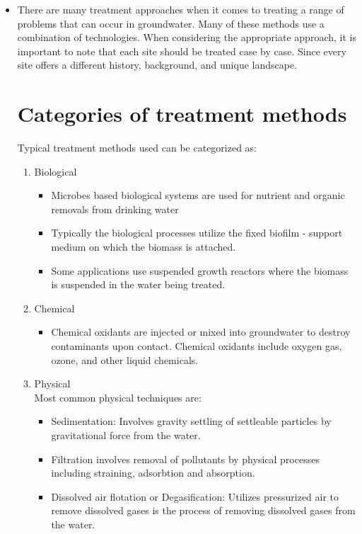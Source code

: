 \begin{itemize}
\item There are many treatment approaches when it comes to treating a range of problems that can occur in groundwater. Many of these methods use a combination of technologies. When considering the appropriate approach, it is important to note that each site should be treated case by case. Since every site offers a different history, background, and unique landscape. 

\section{Categories of treatment methods}
Typical treatment methods used can be categorized as:

\begin{enumerate}
\item Biological\\
\begin{itemize}
\item Microbes based biological systems are used for nutrient and organic removals from drinking water
\item Typically the biological processes utilize the fixed biofilm - support medium on which the biomass is attached.
\item Some applications use suspended growth reactors where the biomass is suspended in the water being treated. 
\end{itemize}

\item Chemical\\
\begin{itemize}
\item Chemical oxidants are injected or mixed into groundwater to destroy contaminants upon contact. Chemical oxidants include oxygen gas, ozone, and other liquid chemicals.\\
\end{itemize}
\item Physical\\
Most common physical techniques are:\\
\begin{itemize}
\item Sedimentation:  Involves gravity settling of settleable particles by gravitational force from the water.
\item Filtration involves removal of pollutants by physical processes including straining, adsorbtion and absorption.
\item Dissolved air flotation or Degasification:  Utilizes pressurized air to remove dissolved gases is the process of removing dissolved gases from the water.


\end{itemize}
\end{enumerate}
\end{itemize}
